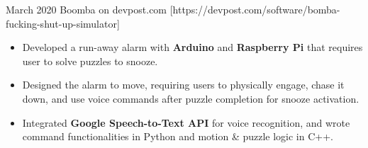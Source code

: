 \documentclass[10pt,a4paper,ragged2e,withhyper]{altacv}
\begin{document}
\begin{paracol}{2}

\divider{}

{March 2020 
  \printinfo{\faGlobe}
  {Boomba on devpost.com}
  [https://devpost.com/software/bomba-fucking-shut-up-simulator]
}{} 
\begin{itemize}
  \item Developed a run-away alarm with \textbf{Arduino} and \textbf{Raspberry
      Pi} that requires user to solve puzzles to snooze.
  \item Designed the alarm to move, requiring users to physically engage, chase it down, and use voice commands after puzzle completion for snooze activation.
  \item Integrated \textbf{Google Speech-to-Text API} for voice recognition, and
      wrote command functionalities in Python and motion \& puzzle logic in C++.
\end{itemize}









\end{paracol}
\end{document}
